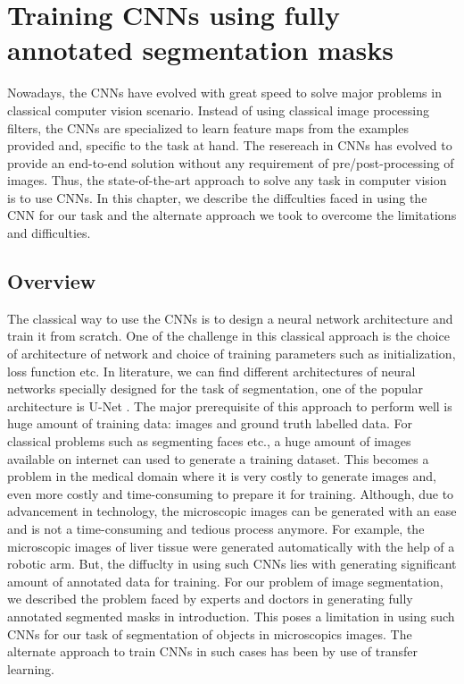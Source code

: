 %
\newpage
\chapter{Training CNNs using fully annotated segmentation masks}
Nowadays, the CNNs have evolved with great speed to solve major problems in classical computer vision scenario. Instead of using classical image processing filters, the CNNs are specialized to learn feature maps from the examples provided and, specific to the task at hand. The resereach in CNNs has evolved to provide an end-to-end solution without any requirement of pre/post-processing of images. Thus, the state-of-the-art approach to solve any task in computer vision is to use CNNs. In this chapter, we describe the diffculties faced in using the CNN for our task and the alternate approach we took to overcome the limitations and difficulties.

\section{Overview}
The classical way to use the CNNs is to design a neural network architecture and train it from scratch. One of the challenge in this classical approach is the choice of architecture of network and choice of training parameters such as initialization, loss function etc. In literature, we can find different architectures of neural networks specially designed for the task of segmentation, one of the popular architecture is U-Net \cite{unet}. The major prerequisite of this approach to perform well is huge amount of training data: images and ground truth labelled data. For classical problems such as segmenting faces etc., a huge amount of images available on internet can used to generate a training dataset. This becomes a problem in the medical domain where it is very costly to generate images and, even more costly and time-consuming to prepare it for training. Although, due to advancement in technology, the microscopic images can be generated with an ease and is not a time-consuming and tedious process anymore. For example, the microscopic images of liver tissue were generated automatically with the help of a robotic arm. But, the diffuclty in using such CNNs lies with generating significant amount of annotated data for training. For our problem of image segmentation, we described the problem faced by experts and doctors in generating fully annotated segmented masks in introduction. This poses a limitation in using such CNNs for our task of segmentation of objects in microscopics images. The alternate approach to train CNNs in such cases has been by use of transfer learning.

